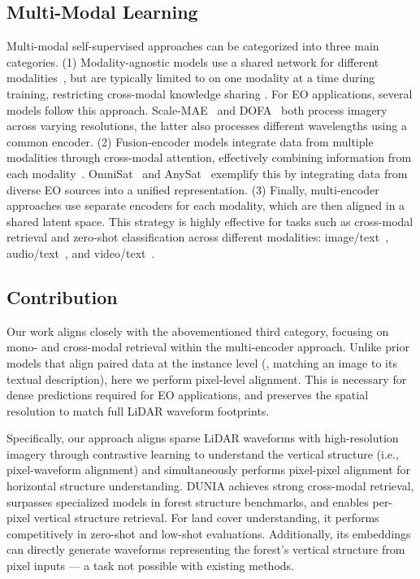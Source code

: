 \subsection{Multi-Modal Learning} 
Multi-modal self-supervised approaches can be categorized into three main categories. (1) Modality-agnostic models use a shared network for different modalities~\cite{Carreira_etal_2022,Girdhar_etal_2022,Jaegle_etal_2021}, but are typically limited to on one modality at a time during training, restricting cross-modal knowledge sharing \cite{Srivastava_etal_2024}. For EO applications, several models follow this approach. Scale-MAE~\cite{Reed_etal_2023} and DOFA~\cite{Xiong_etal_2024} both process imagery across varying resolutions, the latter also processes different wavelengths using a common encoder. (2) Fusion-encoder models integrate data from multiple modalities through cross-modal attention, effectively combining information from each modality~\cite{Bachmann_etal_2022, Bao_etal_2021, Singh_etal_2022}. OmniSat~\cite{Astruc_etal_2025} and AnySat~\cite{astruc2024anysat} exemplify this by integrating data from diverse EO sources into a unified representation. (3) Finally, multi-encoder approaches use separate encoders for each modality, which are then aligned in a shared latent space. This strategy is highly effective for tasks such as cross-modal retrieval and zero-shot classification across different modalities: image/text~\citep{Radford_etal_2021, Jia_etal_2021, Yuan_etal_2021, Yu_etal_2022}, audio/text~\cite{Guzhov_etal_2022}, and video/text~\citep{Luo_etal_2022, Pei_etal_2023}. 

\subsection{Contribution}
Our work aligns closely with the abovementioned third category, focusing on mono- and cross-modal retrieval within the multi-encoder approach. Unlike prior models that align paired data at the instance level (\eg, matching an image to its textual description), here we perform pixel-level alignment. This is necessary for dense predictions required for EO applications, and preserves the spatial resolution to match full LiDAR waveform footprints.

Specifically, our approach aligns sparse LiDAR waveforms with high-resolution imagery through contrastive learning to understand the vertical structure (i.e., pixel-waveform alignment) and simultaneously performs pixel-pixel alignment for horizontal structure understanding. DUNIA achieves strong cross-modal retrieval, surpasses specialized models in forest structure benchmarks, and enables per-pixel vertical structure retrieval. For land cover understanding, it performs competitively in zero-shot and low-shot evaluations. Additionally, its embeddings can directly generate waveforms representing the forest's vertical structure from pixel inputs — a task not possible with existing methods.
